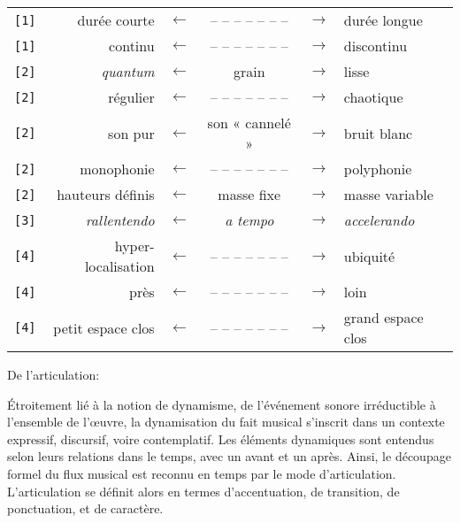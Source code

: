 \documentclass{article}
\begin{document}
\begin{longtable}{lrcccl}
\texttt{[1]} & durée courte & $\leftarrow$ & -- -- -- -- -- -- -- & $\rightarrow$ & durée longue \\
\texttt{[1]} & continu & $\leftarrow$ & -- -- -- -- -- -- -- & $\rightarrow$ & discontinu \\
\texttt{[2]} & \textit{quantum} & $\leftarrow$ & grain & $\rightarrow$ & lisse \\
\texttt{[2]} & régulier & $\leftarrow$ & -- -- -- -- -- -- -- & $\rightarrow$ & chaotique \\
\texttt{[2]} & son pur & $\leftarrow$ & son « cannelé » & $\rightarrow$ & bruit blanc \\
\texttt{[2]} & monophonie & $\leftarrow$ & -- -- -- -- -- -- -- & $\rightarrow$ & polyphonie \\
\texttt{[2]} & hauteurs définis & $\leftarrow$ & masse fixe & $\rightarrow$ & masse variable \\
\texttt{[3]} & \textit{rallentendo} & $\leftarrow$ & \textit{a tempo} & $\rightarrow$ & \textit{accelerando} \\
\texttt{[4]} & hyper-localisation & $\leftarrow$ & -- -- -- -- -- -- -- & $\rightarrow$ & ubiquité \\
\texttt{[4]} & près & $\leftarrow$ & -- -- -- -- -- -- -- & $\rightarrow$ & loin \\
\texttt{[4]} & petit espace clos & $\leftarrow$ & -- -- -- -- -- -- -- & $\rightarrow$ & grand espace clos \\
\end{longtable}



\bigskip

De l'articulation:

\smallskip

\noindent Étroitement lié à la notion de dynamisme, 
de l'événement sonore irréductible à l'ensemble de l'œuvre,
la dynamisation du fait musical
s'inscrit dans un contexte expressif, discursif, voire
 contemplatif. 
 Les éléments dynamiques sont entendus selon leurs relations dans le temps, avec un avant et un après.
Ainsi, le découpage formel du flux musical est reconnu en temps par le mode d’articulation.
L'articulation se définit alors en termes d'accentuation, de transition, de ponctuation, et de caractère.
\end{document}
